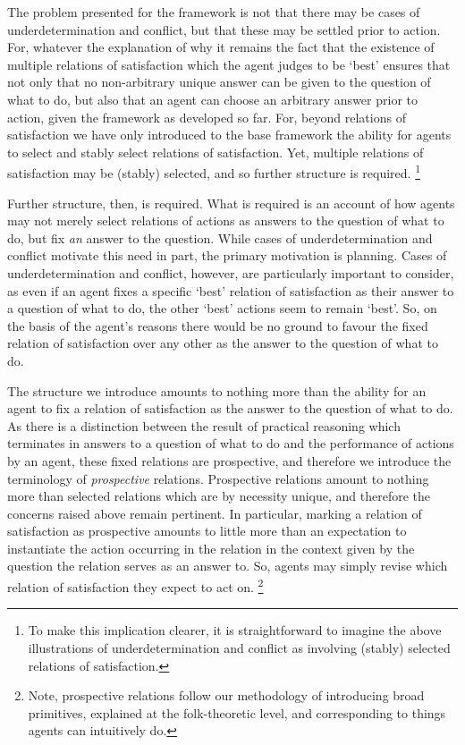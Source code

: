 \documentclass[10pt]{article}
\begin{document}
The problem presented for the framework is not that there may be cases of underdetermination and conflict, but that these may be settled prior to action.
For, whatever the explanation of why it remains the fact that the existence of multiple relations of satisfaction which the agent judges to be `best' ensures that not only that no non-arbitrary unique answer can be given to the question of what to do, but also that an agent can choose an arbitrary answer prior to action, given the framework as developed so far.
For, beyond relations of satisfaction we have only introduced to the base framework the ability for agents to select and stably select relations of satisfaction.
Yet, multiple relations of satisfaction may be (stably) selected, and so further structure is required.\nolinebreak
\footnote{To make this implication clearer, it is straightforward to imagine the above illustrations of underdetermination and conflict as involving (stably) selected relations of satisfaction.}

Further structure, then, is required.
What is required is an account of how agents may not merely select relations of actions as answers to the question of what to do, but fix \emph{an} answer to the question.
While cases of underdetermination and conflict motivate this need in part, the primary motivation is planning.
Cases of underdetermination and conflict, however, are particularly important to consider, as even if an agent fixes a specific `best' relation of satisfaction as their answer to a question of what to do, the other `best' actions seem to remain `best'.
So, on the basis of the agent's reasons there would be no ground to favour the fixed relation of satisfaction over any other as the answer to the question of what to do.

The structure we introduce amounts to nothing more than the ability for an agent to fix a relation of satisfaction as the answer to the question of what to do.
As there is a distinction between the result of practical reasoning which terminates in answers to a question of what to do
and the performance of actions by an agent, these fixed relations are prospective, and therefore we introduce the terminology of \emph{prospective} relations.
Prospective relations amount to nothing more than selected relations which are by necessity unique, and therefore the concerns raised above remain pertinent.
In particular, marking a relation of satisfaction as prospective amounts to little more than an expectation to instantiate the action occurring in the relation in the context given by the question the relation serves as an answer to.
So, agents may simply revise which relation of satisfaction they expect to act on.\nolinebreak
\footnote{Note, prospective relations follow our methodology of introducing broad primitives, explained at the folk-theoretic level, and corresponding to things agents can intuitively do.}
\end{document}
